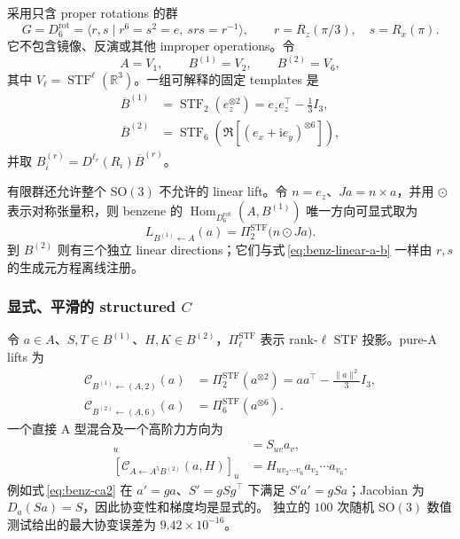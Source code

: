 \documentclass[11pt,a4paper,fontset=fandol]{ctexart}
\newcommand{\R}{\mathbb R}
\newcommand{\SO}{\mathrm{SO}}
\newcommand{\STF}{\operatorname{STF}}
\newcommand{\Hom}{\operatorname{Hom}}
\newcommand{\PiSTF}[1]{\Pi_{#1}^{\mathrm{STF}}}
\begin{document}
采用只含 proper rotations 的群
\begin{equation}
  G=D_6^{\mathrm{rot}}
  =\langle r,s\mid r^6=s^2=e,\ srs=r^{-1}\rangle,
  \qquad r=R_z(\pi/3),\quad s=R_x(\pi).
\end{equation}
它不包含镜像、反演或其他 improper operations。令
\begin{equation}
  A=V_1,
  \qquad B^{(1)}=V_2,
  \qquad B^{(2)}=V_6,
\end{equation}
其中 $V_\ell=\STF^\ell(\R^3)$。一组可解释的固定 templates 是
\begin{align}
  \overline B^{(1)}
  &=\STF_2(e_z^{\otimes2})
  =e_ze_z^\top-\tfrac13I_3,\\
  \overline B^{(2)}
  &=\STF_6\!\left(\Re[(e_x+\mathrm i e_y)^{\otimes6}]\right),
\end{align}
并取 $B_i^{(r)}=D^{\ell_r}(R_i)\overline B^{(r)}$。

有限群还允许整个 $\SO(3)$ 不允许的 linear lift。令 $n=e_z$、$Ja=n\times a$，并用 $\odot$ 表示对称张量积，则 benzene 的
$\Hom_{D_6^{\mathrm{rot}}}(A,B^{(1)})$ 唯一方向可显式取为
\begin{equation}
  L_{B^{(1)}\leftarrow A}(a)=\PiSTF{2}\bigl(n\odot Ja\bigr).
  \label{eq:benz-linear-a-b}
\end{equation}
到 $B^{(2)}$ 则有三个独立 linear directions；它们与式\,\eqref{eq:benz-linear-a-b} 一样由 $r,s$ 的生成元方程离线注册。

\subsubsection{显式、平滑的 structured $C$}

令 $a\in A$、$S,T\in B^{(1)}$、$H,K\in B^{(2)}$，$\PiSTF{\ell}$ 表示 rank-$\ell$ STF 投影。pure-A lifts 为
\begin{align}
  \mathcal C_{B^{(1)}\leftarrow(A,2)}(a)
  &=\PiSTF{2}(a^{\otimes2})
  =aa^\top-\tfrac{\|a\|^2}{3}I_3,
  \label{eq:benz-a2}\\
  \mathcal C_{B^{(2)}\leftarrow(A,6)}(a)
  &=\PiSTF{6}(a^{\otimes6}).
  \label{eq:benz-a6}
\end{align}
一个直接 A 型混合及一个高阶力方向为
\begin{align}
  [\mathcal C_{A\leftarrow AB^{(1)}}(a,S)]_u
  &=S_{uv}a_v,
  \label{eq:benz-ca2}\\
  [\mathcal C_{A\leftarrow A^5B^{(2)}}(a,H)]_u
  &=H_{uv_2\cdots v_6}a_{v_2}\cdots a_{v_6}.
  \label{eq:benz-ca6}
\end{align}
例如式\,\eqref{eq:benz-ca2} 在 $a'=ga$、$S'=gSg^\top$ 下满足
$S'a'=gSa$；Jacobian 为 $D_a(Sa)=S$，因此协变性和梯度均是显式的。
独立的 $100$ 次随机 $\SO(3)$ 数值测试给出的最大协变误差为 $9.42\times10^{-16}$。
\end{document}
